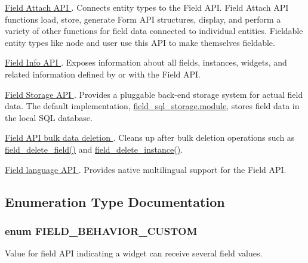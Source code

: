 \begin{DoxyItemize}
\item \hyperlink{group__field__attach}{Field Attach API }. Connects entity types to the Field API. Field Attach API functions load, store, generate Form API structures, display, and perform a variety of other functions for field data connected to individual entities. Fieldable entity types like node and user use this API to make themselves fieldable.
\end{DoxyItemize}


\begin{DoxyItemize}
\item \hyperlink{group__field__info}{Field Info API }. Exposes information about all fields, instances, widgets, and related information defined by or with the Field API.
\end{DoxyItemize}


\begin{DoxyItemize}
\item \hyperlink{group__field__storage}{Field Storage API }. Provides a pluggable back-\/end storage system for actual field data. The default implementation, \hyperlink{field__sql__storage_8module}{field\_\-sql\_\-storage.module}, stores field data in the local SQL database.
\end{DoxyItemize}


\begin{DoxyItemize}
\item \hyperlink{group__field__purge}{Field API bulk data deletion }. Cleans up after bulk deletion operations such as \hyperlink{group__field__crud_gaa4792fd8f5f651b985dec7eca250f0f1}{field\_\-delete\_\-field()} and \hyperlink{group__field__crud_ga16bf0e2a15b20b066ff84403b5f24bf5}{field\_\-delete\_\-instance()}.
\end{DoxyItemize}


\begin{DoxyItemize}
\item \hyperlink{group__field__language}{Field language API }. Provides native multilingual support for the Field API. 
\end{DoxyItemize}

\subsection{Enumeration Type Documentation}
\hypertarget{group__field_gae4cb2db55750703aae033c7b2cd8c465}{
\subsubsection[{FIELD\_\-BEHAVIOR\_\-CUSTOM}]{\setlength{\rightskip}{0pt plus 5cm}enum {\bf FIELD\_\-BEHAVIOR\_\-CUSTOM}}}
\label{group__field_gae4cb2db55750703aae033c7b2cd8c465}
Value for field API indicating a widget can receive several field values.

